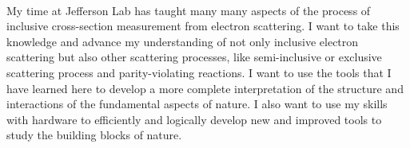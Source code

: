 \documentclass[12pt,letterpaper]{article}
\begin{document}
\paragraph{}
My time at Jefferson Lab has taught many many aspects of the process of inclusive cross-section measurement from electron scattering. I want to take this knowledge and advance my understanding of not only inclusive electron scattering but also other scattering processes, like semi-inclusive or exclusive scattering process and parity-violating reactions. I want to use the tools that I have learned here to develop a more complete interpretation of the structure and interactions of the fundamental aspects of nature. I also want to use my skills with hardware to efficiently and logically develop new and improved tools to study the building blocks of nature. 
\end{document}
